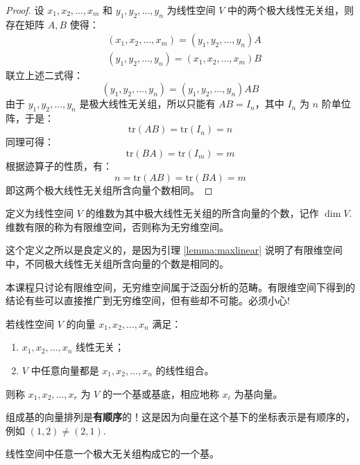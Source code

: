 \begin{proof}
设 $x_1,x_2,\ldots,x_m$ 和 $y_1,y_2,\ldots,y_n$ 为线性空间 $V$ 中的两个极大线性无关组，则存在矩阵 $A,B$ 使得：
\begin{align*}
    &(x_1,x_2,\ldots,x_m)=(y_1,y_2,\ldots,y_n)A\\
    &(y_1,y_2,\ldots,y_n)=(x_1,x_2,\ldots,x_m)B
\end{align*}
联立上述二式得：
\[
    (y_1,y_2,\ldots,y_n)=(y_1,y_2,\ldots,y_n)AB
\]
由于 $y_1,y_2,\ldots,y_n$ 是极大线性无关组，所以只能有 $AB=I_n$，其中 $I_n$ 为 $n$ 阶单位阵，于是：
\[
    \text{tr}(AB)=\text{tr}(I_n)=n
\]
同理可得：
\[
    \text{tr}(BA)=\text{tr}(I_m)=m
\]
根据迹算子的性质，有：
\[
    n=\text{tr}(AB)=\text{tr}(BA)=m
\]
即这两个极大线性无关组所含向量个数相同。
\end{proof}

\begin{definition}[线性空间的维数]
定义为线性空间 $V$ 的维数为其中极大线性无关组的所含向量的个数，记作 $\dim V$. 维数有限的称为有限维空间，否则称为无穷维空间。
\end{definition}

\begin{com}
这个定义之所以是良定义的，是因为引理 \ref{lemma:maxlinear} 说明了有限维空间中，不同极大线性无关组所含向量的个数是相同的。
\end{com}

\begin{remark}
本课程只讨论有限维空间，无穷维空间属于泛函分析的范畴。有限维空间下得到的结论有些可以直接推广到无穷维空间，但有些却不可能。必须小心!
\end{remark}

\begin{definition}[基]
若线性空间 $V$ 的向量 $x_1,x_2,\ldots,x_n$ 满足：
\begin{enumerate}
    \item $x_1,x_2,\ldots,x_n$ 线性无关；
    \item $V$ 中任意向量都是 $x_1,x_2,\ldots,x_n$ 的线性组合。
\end{enumerate}
则称 $x_1,x_2,\ldots,x_r$ 为 $V$ 的一个基或基底，相应地称 $x_i$ 为基向量。
\end{definition}

\begin{note}
组成基的向量排列是\textbf{有顺序}的！这是因为向量在这个基下的坐标表示是有顺序的，例如 $(1,2)\neq (2,1)$.
\end{note}

\begin{corollary}
线性空间中任意一个极大无关组构成它的一个基。
\end{corollary}

